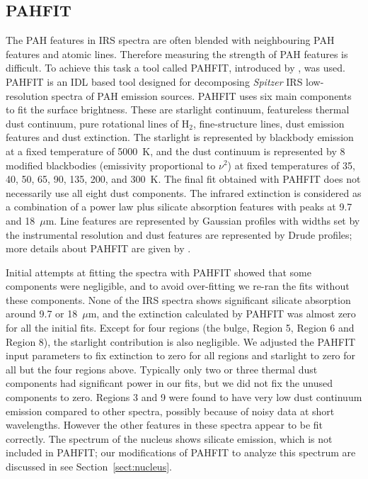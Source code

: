 \documentclass[useAMS,usenatbib,a4paper]{mn2e}
\begin{document}
\subsection{PAHFIT}
\label{sect:pahfit}
The PAH features in  IRS spectra are often blended with neighbouring PAH features and atomic lines. 
Therefore measuring the strength of PAH features is difficult.  To achieve this task a tool called PAHFIT, introduced by \citet{Smith:2007lr}, was used. 
PAHFIT is an IDL  based tool designed for decomposing {\em Spitzer} IRS low-resolution spectra of PAH emission sources.
PAHFIT uses six main components to fit the surface brightness. These are starlight continuum, featureless thermal dust continuum, 
pure rotational lines of H$_2$, fine-structure lines, dust emission features and dust extinction. The starlight is represented by  blackbody 
emission at a fixed temperature of 5000~K, and the dust continuum is represented by 8 modified blackbodies (emissivity proportional to $\nu^2$)  
at fixed temperatures of 35, 40, 50, 65, 90, 135, 200, and 300~K. The final fit obtained with PAHFIT does not necessarily use
all eight dust components.
The infrared extinction is considered as a combination of a power law plus silicate absorption features with peaks at 9.7 and 18~$\mu$m. 
Line features are represented by Gaussian profiles with widths set by the instrumental resolution
and dust features are represented by Drude profiles; more details about PAHFIT are given by \citet{Smith:2007lr}.


Initial attempts at fitting the spectra with PAHFIT showed that some components were negligible, and
to avoid over-fitting we re-ran the fits without these components.
None of the IRS spectra shows significant silicate absorption around 9.7 or 18~$\mu$m, and the extinction calculated by PAHFIT 
was almost zero for all the initial fits. Except for four regions (the bulge, Region 5, Region 6 and Region 8),
the starlight contribution is also negligible.
We adjusted the PAHFIT input parameters to fix extinction to zero for all regions and starlight to zero for all but the four regions above.
Typically only two or three thermal dust components had significant power in our fits, but we did not fix the unused components to zero.
Regions 3 and 9 were found to have very low dust continuum emission compared to other spectra,
possibly because of noisy data at short wavelengths. However the other features in these spectra appear to
be fit correctly. The spectrum of the nucleus shows silicate emission, which is not included in PAHFIT;  
our modifications of PAHFIT to analyze this spectrum are discussed in see Section~\ref{sect:nucleus}.
\end{document}

